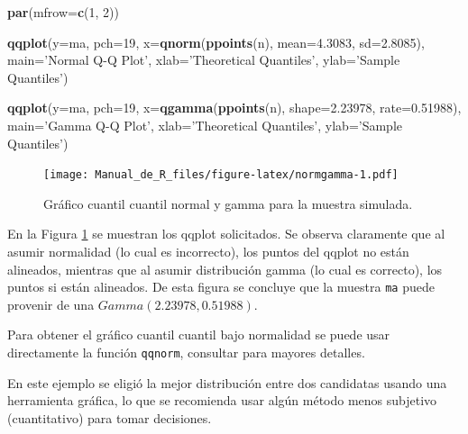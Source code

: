 \documentclass[10pt,]{krantz}
\makeatletter
\newenvironment{Shaded}{\begin{snugshade}}{\end{snugshade}}
\newcommand{\KeywordTok}[1]{\textcolor[rgb]{0.13,0.29,0.53}{\textbf{#1}}}
\newcommand{\DataTypeTok}[1]{\textcolor[rgb]{0.13,0.29,0.53}{#1}}
\newcommand{\DecValTok}[1]{\textcolor[rgb]{0.00,0.00,0.81}{#1}}
\newcommand{\FloatTok}[1]{\textcolor[rgb]{0.00,0.00,0.81}{#1}}
\newcommand{\StringTok}[1]{\textcolor[rgb]{0.31,0.60,0.02}{#1}}
\newcommand{\NormalTok}[1]{#1}
\newenvironment{kframe}{%
\medskip{}
\setlength{\fboxsep}{.8em}
 \def\at@end@of@kframe{}%
 \ifinner\ifhmode%
  \def\at@end@of@kframe{\end{minipage}}%
  \begin{minipage}{\columnwidth}%
 \fi\fi%
 \def\FrameCommand##1{\hskip\@totalleftmargin \hskip-\fboxsep
 \colorbox{shadecolor}{##1}\hskip-\fboxsep
     \hskip-\linewidth \hskip-\@totalleftmargin \hskip\columnwidth}%
 \MakeFramed {\advance\hsize-\width
   \@totalleftmargin\z@ \linewidth\hsize
   \@setminipage}}%
 {\par\unskip\endMakeFramed%
 \at@end@of@kframe}
\renewenvironment{Shaded}{\begin{kframe}}{\end{kframe}}
\let\BeginKnitrBlock\begin \let\EndKnitrBlock\end
\makeatother
\begin{document}
\begin{Shaded}
\begin{Highlighting}[]
\KeywordTok{par}\NormalTok{(}\DataTypeTok{mfrow=}\KeywordTok{c}\NormalTok{(}\DecValTok{1}\NormalTok{, }\DecValTok{2}\NormalTok{))}

\KeywordTok{qqplot}\NormalTok{(}\DataTypeTok{y=}\NormalTok{ma, }\DataTypeTok{pch=}\DecValTok{19}\NormalTok{,}
       \DataTypeTok{x=}\KeywordTok{qnorm}\NormalTok{(}\KeywordTok{ppoints}\NormalTok{(n), }\DataTypeTok{mean=}\FloatTok{4.3083}\NormalTok{, }\DataTypeTok{sd=}\FloatTok{2.8085}\NormalTok{),}
       \DataTypeTok{main=}\StringTok{'Normal Q-Q Plot'}\NormalTok{,}
       \DataTypeTok{xlab=}\StringTok{'Theoretical Quantiles'}\NormalTok{,}
       \DataTypeTok{ylab=}\StringTok{'Sample Quantiles'}\NormalTok{)}

\KeywordTok{qqplot}\NormalTok{(}\DataTypeTok{y=}\NormalTok{ma, }\DataTypeTok{pch=}\DecValTok{19}\NormalTok{,}
       \DataTypeTok{x=}\KeywordTok{qgamma}\NormalTok{(}\KeywordTok{ppoints}\NormalTok{(n), }\DataTypeTok{shape=}\FloatTok{2.23978}\NormalTok{, }\DataTypeTok{rate=}\FloatTok{0.51988}\NormalTok{),}
       \DataTypeTok{main=}\StringTok{'Gamma Q-Q Plot'}\NormalTok{,}
       \DataTypeTok{xlab=}\StringTok{'Theoretical Quantiles'}\NormalTok{,}
       \DataTypeTok{ylab=}\StringTok{'Sample Quantiles'}\NormalTok{)}
\end{Highlighting}
\end{Shaded}

\begin{figure}
\centering
\texttt{[image: Manual\_de\_R\_files/figure-latex/normgamma-1.pdf]}
\caption{\label{fig:normgamma}Gráfico cuantil cuantil normal y gamma para la
muestra simulada.}
\end{figure}

En la Figura \ref{fig:normgamma} se muestran los qqplot solicitados. Se
observa claramente que al asumir normalidad (lo cual es incorrecto), los
puntos del qqplot no están alineados, mientras que al asumir
distribución gamma (lo cual es correcto), los puntos si están alineados.
De esta figura se concluye que la muestra \texttt{ma} puede provenir de
una \(Gamma(2.23978, 0.51988)\).

\BeginKnitrBlock{rmdtip}
Para obtener el gráfico cuantil cuantil bajo normalidad se puede usar
directamente la función \texttt{qqnorm}, consultar
\citet{hernandez_correa} para mayores detalles.
\EndKnitrBlock{rmdtip}

\BeginKnitrBlock{rmdwarning}
En este ejemplo se eligió la mejor distribución entre dos candidatas
usando una herramienta gráfica, lo que se recomienda usar algún método
menos subjetivo (cuantitativo) para tomar decisiones.
\EndKnitrBlock{rmdwarning}
\end{document}

